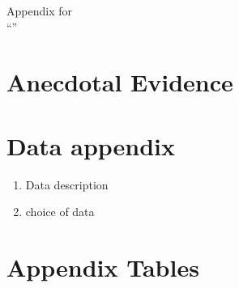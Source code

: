 

\begin{center}
	{ \Large Appendix for \\ ``\tit''}
\end{center}

\setcounter{table}{0}
\renewcommand{\thetable}{A\arabic{table}}

\singlespacing



\section{Anecdotal Evidence}
\label{app:anecdotal}

\section{Data appendix}
\label{app:variables}


\begin{enumerate}
	\item Data description
	\item choice of data
\end{enumerate}


\section*{Appendix Tables}
\label{app:tables}


